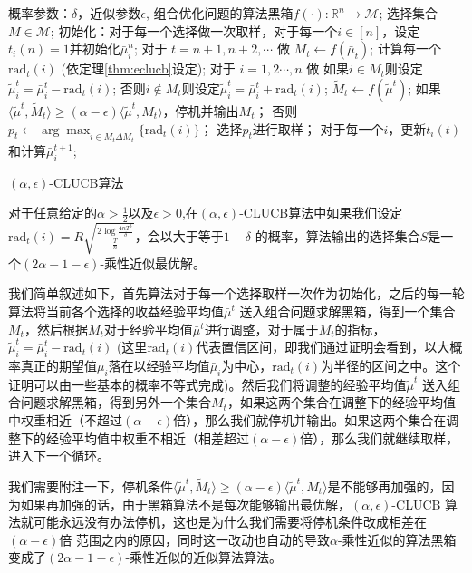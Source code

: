 \documentclass[bachelor]{thuthesis}
\begin{document}
\begin{algorithm}[h]
\centering
\begin{algorithmic}
\REQUIRE 概率参数：$\delta$，近似参数$\epsilon$, 组合优化问题的算法黑箱$f(\cdot):\mathbb{R}^n\to \mathcal{M}$;
\ENSURE 选择集合 $M\in \mathcal{M}$;
\STATE 初始化：对于每一个选择做一次取样，对于每一个$i\in[n]$，设定$t_i(n)=1$并初始化$\bar{\mu}^n_i$;
\STATE 对于 $t=n+1,n+2,\cdots$ 做
\STATE $M_t\gets f(\bar{\mu}_{t})$;
\STATE 计算每一个$\text{rad}_t(i)$ (依定理\ref{thm:eclucb}设定);
\STATE 对于 $i=1,2\cdots,n$ 做
\STATE 如果$i\in M_t$则设定$\tilde{\mu}^t_i=\bar{\mu}^{t}_i-\text{rad}_t(i)$;
\STATE 否则$i\notin M_t$则设定$\tilde{\mu}^t_i=\bar{\mu}^{t}_i+\text{rad}_t(i)$;
\STATE $\tilde{M}_t\gets f(\tilde{\mu}^{t})$;
\STATE 如果$\langle \tilde{\mu}^t,\tilde{M}_t\rangle\ge (\alpha-\epsilon)\langle \tilde{\mu}^t,M_t\rangle$，停机并输出$M_t$；
\STATE 否则$p_t\gets \arg\max_{i\in M_t\Delta \tilde{M}_{t}}\{\text{rad}_t(i)\}$；
\STATE 选择$p_t$进行取样；
\STATE 对于每一个$i$，更新$t_i(t)$和计算$\bar{\mu}^{t+1}_i$;
\end{algorithmic}
\caption{$(\alpha,\epsilon)$-CLUCB算法}
\label{alg:benchmark}
\end{algorithm}

\begin{theorem}
\label{thm:eaclucb}
对于任意给定的$\alpha>\frac{1}{2}$以及$\epsilon>0$,在$(\alpha,\epsilon)$-CLUCB算法中如果我们设定$\text{rad}_t(i)=R\sqrt{\frac{2\log \frac{4nT^3}{\delta}}{\frac{T}{n}}}$，会以大于等于$1-\delta$ 的概率，算法输出的选择集合$S$是一个$(2\alpha-1-\epsilon)$-乘性近似最优解。
\end{theorem}

我们简单叙述如下，首先算法对于每一个选择取样一次作为初始化，之后的每一轮算法将当前各个选择的收益经验平均值$\bar{\mu}^{t}$ 送入组合问题求解黑箱，得到一个集合$M_t$，然后根据$M_t$对于经验平均值$\bar{\mu}^{t}$进行调整，对于属于$M_t$的指标，$\tilde{\mu}_i^t=\bar{\mu}_i^t-\text{rad}_t(i)$ (这里$\text{rad}_t(i)$代表置信区间，即我们通过证明会看到，以大概率真正的期望值$\mu_i$落在以经验平均值$\bar{\mu}_i$为中心，$\text{rad}_t(i)$为半径的区间之中。这个证明可以由一些基本的概率不等式完成)。然后我们将调整的经验平均值$\tilde{\mu}^{t}$ 送入组合问题求解黑箱，得到另外一个集合$M_t$，如果这两个集合在调整下的经验平均值中权重相近（不超过$(\alpha-\epsilon)$倍），那么我们就停机并输出。如果这两个集合在调整下的经验平均值中权重不相近（相差超过$(\alpha-\epsilon)$倍），那么我们就继续取样，进入下一个循环。

我们需要附注一下，停机条件$\langle \tilde{\mu}^t,\tilde{M}_t\rangle\ge (\alpha-\epsilon)\langle \tilde{\mu}^t,M_t\rangle$是不能够再加强的，因为如果再加强的话，由于黑箱算法不是每次能够输出最优解，$(\alpha,\epsilon)$-CLUCB 算法就可能永远没有办法停机，这也是为什么我们需要将停机条件改成相差在$(\alpha-\epsilon)$倍 范围之内的原因，同时这一改动也自动的导致$\alpha$-乘性近似的算法黑箱变成了$(2\alpha-1-\epsilon)$-乘性近似的近似算法算法。
\end{document}
